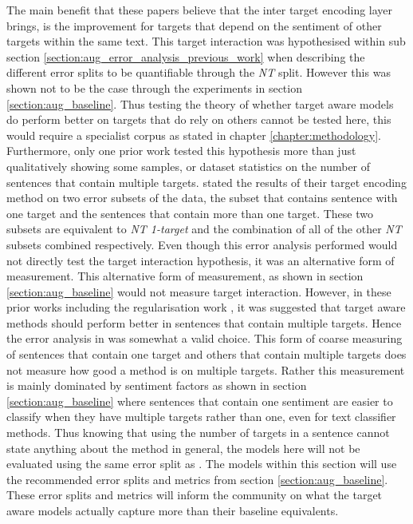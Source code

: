 

The main benefit that these papers believe that the inter target encoding layer brings, is the improvement for targets that depend on the sentiment of other targets within the same text. This target interaction was hypothesised within sub section \ref{section:aug_error_analysis_previous_work} when describing the different error splits to be quantifiable through the \textit{NT} split. However this was shown not to be the case through the experiments in section \ref{section:aug_baseline}. Thus testing the theory of whether target aware models do perform better on targets that do rely on others cannot be tested here, this would require a specialist corpus as stated in chapter \ref{chapter:methodology}. Furthermore, only one prior work \citep{majumder-etal-2018-iarm} tested this hypothesis more than just qualitatively showing some samples, or dataset statistics on the number of sentences that contain multiple targets. \citet{majumder-etal-2018-iarm} stated the results of their target encoding method on two error subsets of the data, the subset that contains sentence with one target and the sentences that contain more than one target. These two subsets are equivalent to \textit{NT 1-target} and the combination of all of the other \textit{NT} subsets combined respectively. Even though this error analysis \citet{majumder-etal-2018-iarm} performed would not directly test the target interaction hypothesis, it was an alternative form of measurement. This alternative form of measurement, as shown in section \ref{section:aug_baseline} would not measure target interaction. However, in these prior works including the regularisation work \citep{fan-etal-2018-multi}, it was suggested that target aware methods should perform better in sentences that contain multiple targets. Hence the error analysis in \citet{majumder-etal-2018-iarm} was somewhat a valid choice. This form of coarse measuring of sentences that contain one target and others that contain multiple targets does not measure how good a method is on multiple targets. Rather this measurement is mainly dominated by sentiment factors as shown in section \ref{section:aug_baseline} where sentences that contain one sentiment are easier to classify when they have multiple targets rather than one, even for text classifier methods. Thus knowing that using the number of targets in a sentence cannot state anything about the method in general, the models here will not be evaluated using the same error split as \citet{majumder-etal-2018-iarm}. The models within this section will use the recommended error splits and metrics from section \ref{section:aug_baseline}. These error splits and metrics will inform the community on what the target aware models actually capture more than their baseline equivalents.

